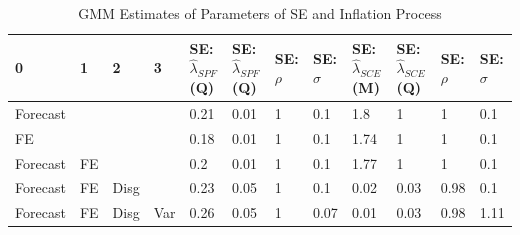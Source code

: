 \documentclass[]{article}
\begin{document}
	\begin{table}
		\centering
	\caption{GMM Estimates of Parameters of SE and Inflation Process}
	\label{GMM_Est_SE_Table}
\begin{tabular}{llllllllllll}
	\hline 
	0        & 1  & 2    & 3   & SE: $\hat\lambda_{SPF}$(Q) & SE: $\hat\lambda_{SPF}$(Q) & SE: $\rho$ & SE: $\sigma$ & SE: $\hat\lambda_{SCE}$(M) & SE: $\hat\lambda_{SCE}$(Q) & SE: $\rho$ & SE: $\sigma$ \\
	\hline 
	Forecast &    &      &     & 0.21                       & 0.01                       & 1          & 0.1          & 1.8                        & 1                          & 1          & 0.1          \\
		\hline 
	FE       &    &      &     & 0.18                       & 0.01                       & 1          & 0.1          & 1.74                       & 1                          & 1          & 0.1          \\
		\hline 
	Forecast & FE &      &     & 0.2                        & 0.01                       & 1          & 0.1          & 1.77                       & 1                          & 1          & 0.1          \\
		\hline 
	Forecast & FE & Disg &     & 0.23                       & 0.05                       & 1          & 0.1          & 0.02                       & 0.03                       & 0.98       & 0.1          \\
		\hline 
	Forecast & FE & Disg & Var & 0.26                       & 0.05                       & 1          & 0.07         & 0.01                       & 0.03                       & 0.98       & 1.11         \\
		\hline 
\end{tabular}
\end{table}
\end{document}

